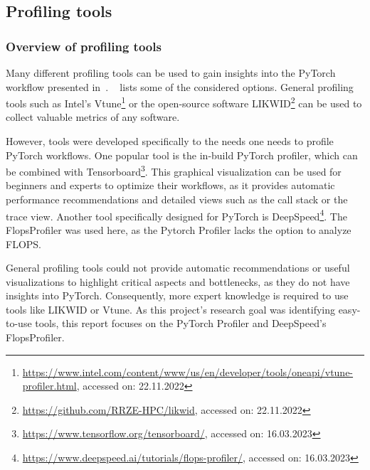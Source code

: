 \documentclass[12pt, a4paper, hidelinks]{article}
\begin{document}
\subsection{Profiling tools}

\subsubsection{Overview of profiling tools}
\label{sec:tools-overview}

Many different profiling tools can be used to gain insights into the PyTorch workflow presented in~. 
~ lists some of the considered options.
General profiling tools such as Intel's Vtune\footnote{\url{https://www.intel.com/content/www/us/en/developer/tools/oneapi/vtune-profiler.html}, accessed on: 22.11.2022} or the open-source software LIKWID\footnote{\url{https://github.com/RRZE-HPC/likwid}, accessed on: 22.11.2022} can be used to collect valuable metrics of any software.

However, tools were developed specifically to the needs one needs to profile PyTorch workflows.
One popular tool is the in-build PyTorch profiler, which can be combined with Tensorboard\footnote{\url{https://www.tensorflow.org/tensorboard/}, accessed on: 16.03.2023}. This graphical visualization can be used for beginners and experts to optimize their workflows, as it provides automatic performance recommendations and detailed views such as the call stack or the trace view.
Another tool specifically designed for PyTorch is DeepSpeed\footnote{\url{https://www.deepspeed.ai/tutorials/flops-profiler/}, accessed on: 16.03.2023}. The FlopsProfiler was used here, as the Pytorch Profiler lacks the option to analyze FLOPS.


General profiling tools could not provide automatic recommendations or useful visualizations to highlight critical aspects and bottlenecks, as they do not have insights into PyTorch. Consequently, more expert knowledge is required to use tools like LIKWID or Vtune.
As this project's research goal was identifying easy-to-use tools, this report focuses on the PyTorch Profiler and DeepSpeed's FlopsProfiler.
\end{document}
